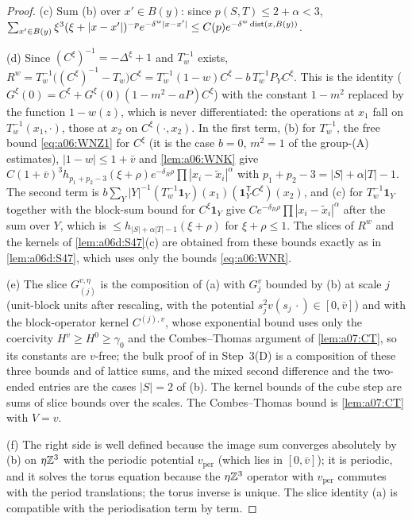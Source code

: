 \begin{proof}
(c) Sum (b) over $x'\in B(y)$: since $p(S,T)\le2+\alpha<3$, $\sum_{x'\in B(y)}\xi^3(\xi+|x-x'|)^{-p}e^{-\delta^w|x-x'|}\le C(p)e^{-\delta^w\operatorname{dist}(x,B(y))}$.

(d) Since $(C^\xi)^{-1}=-\Delta^\xi+1$ and $T_w^{-1}$ exists, $R^w=T_w^{-1}\big((C^\xi)^{-1}-T_w\big)C^\xi=T_w^{-1}(1-w)C^\xi-b\,T_w^{-1}P_YC^\xi$. This is the identity \cite[p.~437]{Ba3} ($G^\xi(0)=C^\xi+G^\xi(0)(1-m^2-aP)C^\xi$) with the constant $1-m^2$ replaced by the function $1-w(z)$, which is never differentiated: the operations at $x_1$ fall on $T_w^{-1}(x_1,\cdot)$, those at $x_2$ on $C^\xi(\cdot,x_2)$. In the first term, (b) for $T_w^{-1}$, the free bound \eqref{eq:a06:WNZ1} for $C^\xi$ (it is the case $b=0$, $m^2=1$ of the group-(A) estimates), $|1-w|\le1+\bar v$ and \cref{lem:a06:WNK} give $C(1+\bar v)^3h_{p_1+p_2-3}(\xi+\rho)e^{-\delta_R\rho}\prod|x_i-\tilde x_i|^\alpha$ with $p_1+p_2-3=|S|+\alpha|T|-1$. The second term is $b\sum_Y|Y|^{-1}(T_w^{-1}\mathbf 1_Y)(x_1)(\mathbf 1_Y^{\mathsf T}C^\xi)(x_2)$, and (c) for $T_w^{-1}\mathbf 1_Y$ together with the block-sum bound for $C^\xi\mathbf 1_Y$ give $Ce^{-\delta_R\rho}\prod|x_i-\tilde x_i|^\alpha$ after the sum over $Y$, which is $\le h_{|S|+\alpha|T|-1}(\xi+\rho)$ for $\xi+\rho\le1$. The slices of $R^w$ and the kernels of \cref{lem:a06d:S47}(c) are obtained from these bounds exactly as in \cref{lem:a06d:S47}, which uses only the bounds \eqref{eq:a06:WNR}.

(e) The slice $G^{v,\eta}_{(j)}$ is the composition of (a) with $G^v_j$ bounded by (b) at scale $j$ (unit-block units after rescaling, with the potential $s_j^2v(s_j\,\cdot)\in[0,\bar v]$) and with the block-operator kernel $C^{(j),v}$, whose exponential bound uses only the coercivity $H^v\ge H^0\ge\gamma_0$ and the Combes--Thomas argument of \cref{lem:a07:CT}, so its constants are $v$-free; the bulk proof of \cite[(2.10)--(2.12)]{Ba3} in Step~3(D) is a composition of these three bounds and of lattice sums, and the mixed second difference and the two-ended entries are the cases $|S|=2$ of (b). The kernel bounds of the cube step are sums of slice bounds over the scales. The Combes--Thomas bound is \cref{lem:a07:CT} with $V=v$.

(f) The right side is well defined because the image sum converges absolutely by (b) on $\eta\mathbb Z^3$ with the periodic potential $v_{\mathrm{per}}$ (which lies in $[0,\bar v]$); it is periodic, and it solves the torus equation because the $\eta\mathbb Z^3$ operator with $v_{\mathrm{per}}$ commutes with the period translations; the torus inverse is unique. The slice identity (a) is compatible with the periodisation term by term.
\end{proof}
